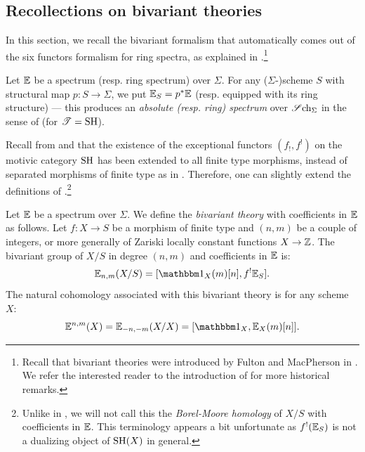 \subsection{Recollections on bivariant theories}\label{sec:bivariant}

\begin{num}
In this section, we recall the bivariant formalism that automatically comes out of
the six functors formalism for ring spectra, as explained in \cite{Deg16}.\footnote{Recall
that bivariant theories were introduced by Fulton and MacPherson in \cite{FMP}. We refer the 
interested reader to the introduction of \cite{Deg16} for more historical remarks.}

Let $\mathbb E$ be a spectrum (resp. ring spectrum) over $\Sigma$. For any ($\Sigma$-)scheme $S$
with structural map $p:S \rightarrow \Sigma$, we put $\mathbb E_S=p^*\mathbb E$  (resp. equipped with its ring structure)
--- this produces an \emph{absolute (resp. ring) spectrum} over $\operatorname{\mathscr Sch_\Sigma}$
in the sense of \cite[Def. 1.1.1]{Deg16} (for $\mathscr T=\operatorname{SH}$).

Recall from \cite{LZ} and \cite[Th. 2.34]{Khan} that the existence of the exceptional functors
$(f_!,f^!)$ on the motivic category $\operatorname{SH}$ has been extended to all finite type morphisms,
instead of separated morphisms of finite type as in \cite{CD3}.
Therefore, one can slightly extend the definitions of \cite[Sec. 1.2]{Deg16}.\footnote{Unlike in \cite[Def. 1.2.2]{Deg16},
we will not call this the \emph{Borel-Moore homology} of $X/S$ with coefficients in $\mathbb E$.
This terminology appears a bit unfortunate as $f^!(\mathbb E_S)$ is not a dualizing object of $\operatorname{SH}(X)$ in general.}
\end{num}
\begin{df}\label{df:bivariant}
Let $\mathbb E$ be a spectrum over $\Sigma$.
We define the \emph{bivariant theory} with coefficients in $\mathbb E$ as follows.
Let $f:X \rightarrow S$ be a morphism of finite type and  $(n,m)$ be a couple of integers,
or more generally of Zariski locally constant functions $X \rightarrow \mathbb{Z}$.
The bivariant group of $X/S$ in degree $(n,m)$ and coefficients in $\mathbb E$ is:
$$
\E_{n,m}(X/S)=[\un_X(m)[n],f^!\E_S].
$$
The natural cohomology associated with this bivariant theory is for any scheme $X$:
\begin{equation}\label{eq:biv->coh}
\E^{n,m}(X)=\E_{-n,-m}(X/X)=[\un_X,\E_X(m)[n]].
\end{equation}
\end{df}

